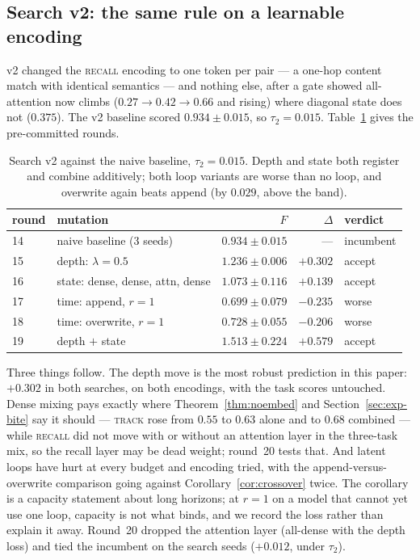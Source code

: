 \subsection{Search v2: the same rule on a learnable encoding}

v2 changed the \textsc{recall} encoding to one token per pair --- a one-hop
content match with identical semantics --- and nothing else, after a gate
showed all-attention now climbs ($0.27 \to 0.42 \to 0.66$ and rising) where
diagonal state does not ($0.375$). The v2 baseline scored $0.934 \pm 0.015$,
so $\tau_2 = 0.015$. Table~\ref{tab:search} gives the pre-committed rounds.

\begin{table}[h]
\centering
\begin{tabular}{llrrl}
\toprule
round & mutation & $F$ & $\Delta$ & verdict \\
\midrule
14 & naive baseline (3 seeds) & $0.934 \pm 0.015$ & --- & incumbent \\
15 & depth: $\lambda = 0.5$ & $1.236 \pm 0.006$ & $+0.302$ & accept \\
16 & state: dense, dense, attn, dense & $1.073 \pm 0.116$ & $+0.139$ & accept \\
17 & time: append, $r = 1$ & $0.699 \pm 0.079$ & $-0.235$ & worse \\
18 & time: overwrite, $r = 1$ & $0.728 \pm 0.055$ & $-0.206$ & worse \\
19 & depth $+$ state & $1.513 \pm 0.224$ & $+0.579$ & accept \\
\bottomrule
\end{tabular}
\caption{Search v2 against the naive baseline, $\tau_2 = 0.015$. Depth and
state both register and combine additively; both loop variants are worse
than no loop, and overwrite again beats append (by $0.029$, above the band).}
\label{tab:search}
\end{table}

Three things follow. The depth move is the most robust prediction in this
paper: $+0.302$ in both searches, on both encodings, with the task scores
untouched. Dense mixing pays exactly where Theorem~\ref{thm:noembed} and
Section~\ref{sec:exp-bite} say it should --- \textsc{track} rose from $0.55$
to $0.63$ alone and to $0.68$ combined --- while \textsc{recall} did not move
with or without an attention layer in the three-task mix, so the recall
layer may be dead weight; round~20 tests that. And latent loops have hurt at
every budget and encoding tried, with the append-versus-overwrite comparison
going against Corollary~\ref{cor:crossover} twice. The corollary is a
capacity statement about long horizons; at $r = 1$ on a model that cannot yet
use one loop, capacity is not what binds, and we record the loss rather than
explain it away. Round~20 dropped the attention layer (all-dense with the depth loss)
and tied the incumbent on the search seeds ($+0.012$, under $\tau_2$).

